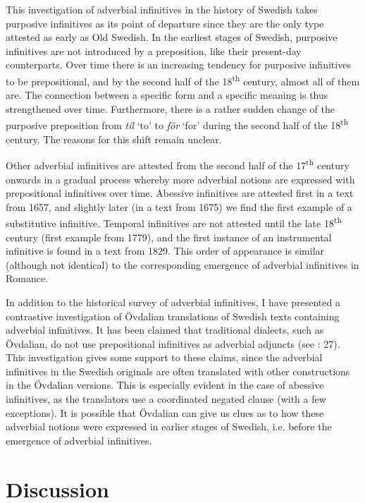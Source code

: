 \documentclass[output=paper]{langscibook}
\begin{document}
This investigation of adverbial infinitives in the history of Swedish takes purposive infinitives as its point of departure since they are the only type attested as early as Old Swedish. In the earliest stages of Swedish, purposive infinitives are not introduced by a preposition, like their present-day counterparts. Over time there is an increasing tendency for purposive infinitives to be prepositional, and by the second half of the 18\textsuperscript{th} century, almost all of them are. The connection between a specific form and a specific meaning is thus strengthened over time. Furthermore, there is a rather sudden change of the purposive preposition from \textit{til} ‘to’ to \textit{för} ‘for’ during the second half of the 18\textsuperscript{th} century. The reasons for this shift remain unclear. 



Other adverbial infinitives are attested from the second half of the 17\textsuperscript{th} century onwards in a gradual process whereby more adverbial notions are expressed with prepositional infinitives over time. Abessive infinitives are attested first in a text from 1657, and slightly later (in a text from 1675) we find the first example of a substitutive infinitive. Temporal infinitives are not attested until the late 18\textsuperscript{th} century (first example from 1779), and the first instance of an instrumental infinitive is found in a text from 1829. This order of appearance is similar (although not identical) to the corresponding emergence of adverbial infinitives in Romance. 



In addition to the historical survey of adverbial infinitives, I have presented a contrastive investigation of Övdalian translations of Swedish texts containing adverbial infinitives. It has been claimed that traditional dialects, such as Övdalian, do not use prepositional infinitives as adverbial adjuncts (see \citealt{Holm1967}: 27). This investigation gives some support to these claims, since the adverbial infinitives in the Swedish originals are often translated with other constructions in the Övdalian versions. This is especially evident in the case of abessive infinitives, as the translators use a coordinated negated clause (with a few exceptions). It is possible that Övdalian can give us clues as to how these adverbial notions were expressed in earlier stages of Swedish, i.e. before the emergence of adverbial infinitives. 


\section{Discussion}\label{sec:kalm:5}
\end{document}
